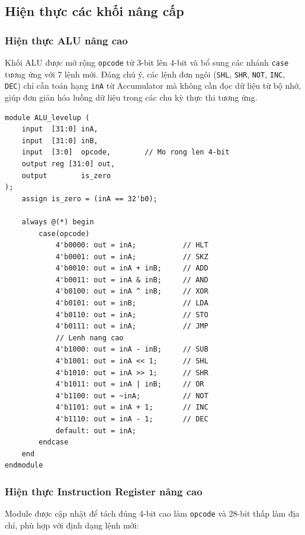 \subsection{Hiện thực các khối nâng cấp}

\subsubsection{Hiện thực ALU nâng cao}
Khối ALU được mở rộng \texttt{opcode} từ 3-bit lên 4-bit và bổ sung các nhánh \texttt{case} tương ứng với 7 lệnh mới. Đáng chú ý, các lệnh đơn ngôi (\texttt{SHL}, \texttt{SHR}, \texttt{NOT}, \texttt{INC}, \texttt{DEC}) chỉ cần toán hạng \texttt{inA} từ Accumulator mà không cần đọc dữ liệu từ bộ nhớ, giúp đơn giản hóa luồng dữ liệu trong các chu kỳ thực thi tương ứng.

\begin{lstlisting}[caption=Mã nguồn Verilog cho ALU nâng cao (ALU\_levelup.v)]
module ALU_levelup (
    input  [31:0] inA,
    input  [31:0] inB,
    input  [3:0]  opcode,        // Mo rong len 4-bit
    output reg [31:0] out,
    output        is_zero
);
    assign is_zero = (inA == 32'b0);

    always @(*) begin
        case(opcode)
            4'b0000: out = inA;           // HLT
            4'b0001: out = inA;           // SKZ
            4'b0010: out = inA + inB;     // ADD
            4'b0011: out = inA & inB;     // AND
            4'b0100: out = inA ^ inB;     // XOR
            4'b0101: out = inB;           // LDA
            4'b0110: out = inA;           // STO
            4'b0111: out = inA;           // JMP
            // Lenh nang cao
            4'b1000: out = inA - inB;     // SUB
            4'b1001: out = inA << 1;      // SHL
            4'b1010: out = inA >> 1;      // SHR
            4'b1011: out = inA | inB;     // OR
            4'b1100: out = ~inA;          // NOT
            4'b1101: out = inA + 1;       // INC
            4'b1110: out = inA - 1;       // DEC
            default: out = inA;
        endcase
    end
endmodule
\end{lstlisting}

\subsubsection{Hiện thực Instruction Register nâng cao}
Module được cập nhật để tách đúng 4-bit cao làm \texttt{opcode} và 28-bit thấp làm địa chỉ, phù hợp với định dạng lệnh mới:

